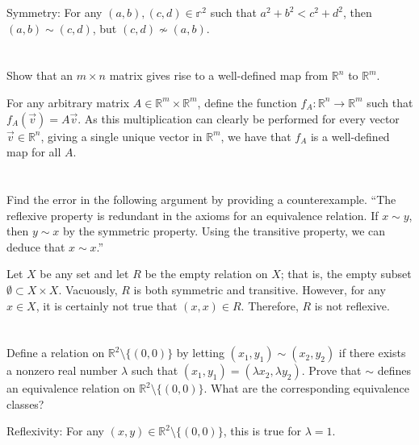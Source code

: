 \smallskip

Symmetry: For any $(a, b), (c, d) \in \mathbb{r}^2$ such that $a^2 + b^2 < c^2 + d^2$, then $(a, b) \sim (c, d)$, but $(c, d) \nsim (a, b)$.

\section{}\label{sec:27}

Show that an $m \times n$ matrix gives rise to a well-defined map from $\mathbb{R}^n$ to $\mathbb{R}^m$.
\hr

For any arbitrary matrix $A \in \mathbb{R}^m \times \mathbb{R}^m$, define the function $f_A: \mathbb{R}^n \rightarrow \mathbb{R}^m$ such that $f_A(\vec{v}) = A\vec{v}$. As this multiplication can clearly be performed for every vector $\vec{v} \in \mathbb{R}^n$, giving a single unique vector in $\mathbb{R}^m$, we have that $f_A$ is a well-defined map for all $A$.
\pagebreak
\section{}\label{sec:28}

Find the error in the following argument by providing a counterexample. ``The reflexive property is redundant in the axioms for an equivalence relation. If $x \sim y$, then $y \sim x$ by the symmetric property. Using the transitive property, we can deduce that $x \sim x$.''
\hr

Let $X$ be any set and let $R$ be the empty relation on $X$; that is, the empty subset $\emptyset \subset X \times X$. Vacuously, $R$ is both symmetric and transitive. However, for any $x \in X$, it is certainly not true that $(x, x) \in R$. Therefore, $R$ is not reflexive.

\section{}\label{sec:29}

Define a relation on $\mathbb{R}^2 \setminus \{(0, 0)\}$ by letting $(x_1, y_1) \sim (x_2, y_2)$ if there exists a nonzero real number $\lambda$ such that $(x_1, y_1) = (\lambda x_2, \lambda y_2)$. Prove that $\sim$ defines an equivalence relation on $\mathbb{R}^2 \setminus \{(0, 0)\}$. What are the corresponding equivalence classes?
\hr

Reflexivity: For any $(x, y) \in \mathbb{R}^2 \setminus \{(0, 0)\}$, this is true for $\lambda = 1$.

\smallskip

